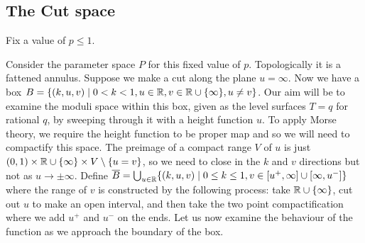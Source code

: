 \subsection{The Cut space}

Fix a value of $p \leq 1$.

Consider the parameter space $P$ for this fixed value of $p$. Topologically it is a fattened annulus. Suppose we make a cut along the plane $u=\infty$. Now we have a box $B = \{(k,u,v)\mid 0 < k <1, u \in \mathbb{R} , v \in\mathbb{R}\cup\{\infty\}, u \neq v\}$. Our aim will be to examine the moduli space within this box, given as the level surfaces $T=q$ for rational $q$, by sweeping through it with a height function $u$. To apply Morse theory, we require the height function to be proper map and so we will need to compactify this space. The preimage of a compact range $V$ of $u$ is just $(0,1)\times \mathbb{R}\cup\{\infty\}\times V \setminus \{u=v\} $, so we need to close in the $k$ and $v$ directions but not as $u\to\pm\infty$. Define $\overline{B} = \bigcup_{u\in\mathbb{R}} \{(k,u,v)\mid 0 \leq k \leq 1, v \in [u^+, \infty] \cup [\infty, u^-] \}$ where the range of $v$ is constructed by the following process: take $\mathbb{R}\cup\{\infty\}$, cut out $u$ to make an open interval, and then take the two point compactification where we add $u^+$ and $u^-$ on the ends. Let us now examine the behaviour of the function as we approach the boundary of the box.



